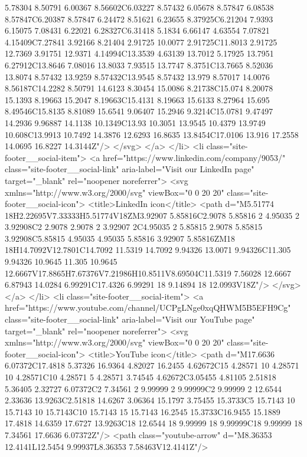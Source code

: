 {{{5.78304 8.50791 6.00367 8.56602C6.03227 8.57432 6.05678 8.57847 6.08538 8.57847C6.20387 8.57847 6.24472 8.51621 6.23655 8.37925C6.21204 7.9393 6.15075 7.08431 6.22021 6.28327C6.31418 5.1834 6.66147 4.63554 7.07821 4.15409C7.27841 3.92166 8.21404 2.91725 10.0077 2.91725C11.8013 2.91725 12.7369 3.91751 12.9371 4.14994C13.3539 4.63139 13.7012 5.17925 13.7951 6.27912C13.8646 7.08016 13.8033 7.93515 13.7747 8.3751C13.7665 8.52036 13.8074 8.57432 13.9259 8.57432C13.9545 8.57432 13.979 8.57017 14.0076 8.56187C14.2282 8.50791 14.6123 8.30454 15.0086 8.21738C15.074 8.20078 15.1393 8.19663 15.2047 8.19663C15.4131 8.19663 15.6133 8.27964 15.695 8.49546C15.8135 8.81089 15.6541 9.06407 15.2946 9.3214C15.0781 9.47497 14.2936 9.96887 14.1138 10.1349C13.93 10.3051 13.9545 10.4379 13.9749 10.608C13.9913 10.7492 14.3876 12.6293 16.8635 13.8454C17.0106 13.916 17.2558 14.0695 16.8227 14.3144Z"/>
</svg>
</a>
</li>
<li class="site-footer__social-item">
<a href="https://www.linkedin.com/company/9053/" class="site-footer__social-link" aria-label="Visit our LinkedIn page" target="_blank" rel="noopener noreferrer">
<svg xmlns="http://www.w3.org/2000/svg" viewBox="0 0 20 20" class="site-footer__social-icon">
<title>LinkedIn icon</title>
<path d="M5.51774 18H2.22695V7.33333H5.51774V18ZM3.92907 5.85816C2.9078 5.85816 2 4.95035 2 3.92908C2 2.9078 2.9078 2 3.92907 2C4.95035 2 5.85815 2.9078 5.85815 3.92908C5.85815 4.95035 4.95035 5.85816 3.92907 5.85816ZM18 18H14.7092V12.7801C14.7092 11.5319 14.7092 9.94326 13.0071 9.94326C11.305 9.94326 10.9645 11.305 10.9645 12.6667V17.8865H7.67376V7.21986H10.8511V8.69504C11.5319 7.56028 12.6667 6.87943 14.0284 6.99291C17.4326 6.99291 18 9.14894 18 12.0993V18Z"/>
</svg>
</a>
</li>
<li class="site-footer__social-item">
<a href="https://www.youtube.com/channel/UCPgLNge0xqQHWM5B5EFH9Cg" class="site-footer__social-link" aria-label="Visit our YouTube page" target="_blank" rel="noopener noreferrer">
<svg xmlns="http://www.w3.org/2000/svg" viewBox="0 0 20 20" class="site-footer__social-icon">
<title>YouTube icon</title>
<path d="M17.6636 6.07372C17.4818 5.37326 16.9364 4.82027 16.2455 4.62672C15 4.28571 10 4.28571 10 4.28571C10 4.28571 5 4.28571 3.74545 4.62672C3.05455 4.81105 2.51818 5.36405 2.32727 6.07372C2 7.34561 2 9.99999 2 9.99999C2 9.99999 2 12.6544 2.33636 13.9263C2.51818 14.6267 3.06364 15.1797 3.75455 15.3733C5 15.7143 10 15.7143 10 15.7143C10 15.7143 15 15.7143 16.2545 15.3733C16.9455 15.1889 17.4818 14.6359 17.6727 13.9263C18 12.6544 18 9.99999 18 9.99999C18 9.99999 18 7.34561 17.6636 6.07372Z"/>
<path class="youtube-arrow" d="M8.36353 12.4141L12.5454 9.99937L8.36353 7.58463V12.4141Z"/>
}}}

